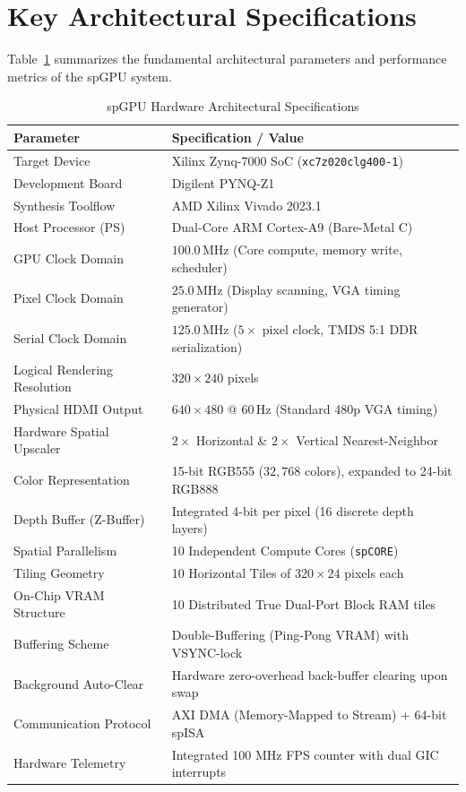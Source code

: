 \section{Key Architectural Specifications}
Table~\ref{tab:system_specs} summarizes the fundamental architectural parameters and performance metrics of the spGPU system.

\begin{table}[htbp]
\centering
\caption{spGPU Hardware Architectural Specifications}
\label{tab:system_specs}
\begin{tabular}{@{}ll@{}}
\toprule
\textbf{Parameter} & \textbf{Specification / Value} \\ \midrule
Target Device & Xilinx Zynq-7000 SoC (\texttt{xc7z020clg400-1}) \\
Development Board & Digilent PYNQ-Z1 \\
Synthesis Toolflow & AMD Xilinx Vivado 2023.1 \\
Host Processor (PS) & Dual-Core ARM Cortex-A9 (Bare-Metal C) \\
GPU Clock Domain & $100.0\,\text{MHz}$ (Core compute, memory write, scheduler) \\
Pixel Clock Domain & $25.0\,\text{MHz}$ (Display scanning, VGA timing generator) \\
Serial Clock Domain & $125.0\,\text{MHz}$ ($5\times$ pixel clock, TMDS 5:1 DDR serialization) \\
Logical Rendering Resolution & $320 \times 240$ pixels \\
Physical HDMI Output & $640 \times 480$ @ $60\,\text{Hz}$ (Standard 480p VGA timing) \\
Hardware Spatial Upscaler & $2\times$ Horizontal \& $2\times$ Vertical Nearest-Neighbor \\
Color Representation & 15-bit RGB555 ($32{,}768$ colors), expanded to 24-bit RGB888 \\
Depth Buffer (Z-Buffer) & Integrated 4-bit per pixel (16 discrete depth layers) \\
Spatial Parallelism & 10 Independent Compute Cores (\texttt{spCORE}) \\
Tiling Geometry & 10 Horizontal Tiles of $320 \times 24$ pixels each \\
On-Chip VRAM Structure & 10 Distributed True Dual-Port Block RAM tiles \\
Buffering Scheme & Double-Buffering (Ping-Pong VRAM) with VSYNC-lock \\
Background Auto-Clear & Hardware zero-overhead back-buffer clearing upon swap \\
Communication Protocol & AXI DMA (Memory-Mapped to Stream) + 64-bit spISA \\
Hardware Telemetry & Integrated 100 MHz FPS counter with dual GIC interrupts \\ \bottomrule
\end{tabular}
\end{table}

